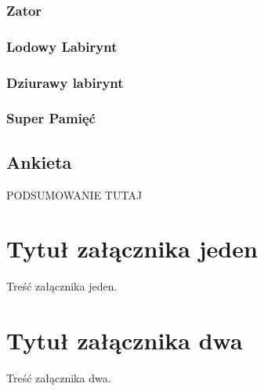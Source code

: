 \documentclass[openright]{xmgr}
\begin{document}
\subsection{Zator}
\subsection{Lodowy Labirynt}
\subsection{Dziurawy labirynt}
\subsection{Super Pamięć}

\section{Ankieta}




\summary

PODSUMOWANIE TUTAJ

\appendix
\chapter{Tytuł załącznika jeden}

Treść załącznika jeden.

\chapter{Tytuł załącznika dwa}

Treść załącznika dwa.




\listoftables

\listoffigures

\oswiadczenie
\end{document}
